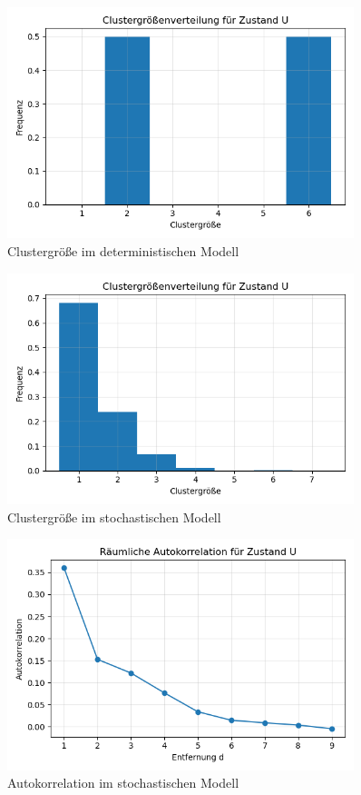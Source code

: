 \documentclass{SeminarV2}
\begin{document}
\begin{itemize}
\begin{figure}[htbp]
  \centering
  \includegraphics[width=0.9\textwidth]{images/Cluster_det.png}
  \caption{Clustergröße im deterministischen Modell}
  \label{fig:Histone_states_cluster_det}
  \end{figure}
\begin{figure}[htbp]
  \centering
  \includegraphics[width=0.9\textwidth]{images/Cluster_stoch.png}
  \caption{Clustergröße im stochastischen Modell}
  \label{fig:Histone_states_cluster_stoch}
  \end{figure}


\begin{figure} [htbp]
  \centering
  \includegraphics[width=0.9\textwidth]{images/Autokor_stoch.png}
  \caption{Autokorrelation im stochastischen Modell}
  \label{fig:Histone_states_auto_stoch}
  \end{figure}


\end{itemize}
\end{document}
